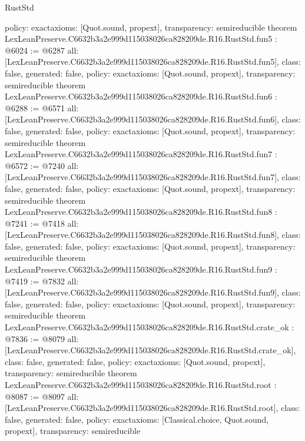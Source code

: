 \begin{lexlean}{RustStd}
\begin{coremodule}
{  policy: exact{axioms: [Quot.sound, propext]},
  transparency: semireducible
}
theorem LexLeanPreserve.C6632b3a2e999d115038026ca828209de.R16.RustStd.fun5 : @6024 := @6287 {
  all: [LexLeanPreserve.C6632b3a2e999d115038026ca828209de.R16.RustStd.fun5],
  class: false,
  generated: false,
  policy: exact{axioms: [Quot.sound, propext]},
  transparency: semireducible
}
theorem LexLeanPreserve.C6632b3a2e999d115038026ca828209de.R16.RustStd.fun6 : @6288 := @6571 {
  all: [LexLeanPreserve.C6632b3a2e999d115038026ca828209de.R16.RustStd.fun6],
  class: false,
  generated: false,
  policy: exact{axioms: [Quot.sound, propext]},
  transparency: semireducible
}
theorem LexLeanPreserve.C6632b3a2e999d115038026ca828209de.R16.RustStd.fun7 : @6572 := @7240 {
  all: [LexLeanPreserve.C6632b3a2e999d115038026ca828209de.R16.RustStd.fun7],
  class: false,
  generated: false,
  policy: exact{axioms: [Quot.sound, propext]},
  transparency: semireducible
}
theorem LexLeanPreserve.C6632b3a2e999d115038026ca828209de.R16.RustStd.fun8 : @7241 := @7418 {
  all: [LexLeanPreserve.C6632b3a2e999d115038026ca828209de.R16.RustStd.fun8],
  class: false,
  generated: false,
  policy: exact{axioms: [Quot.sound, propext]},
  transparency: semireducible
}
theorem LexLeanPreserve.C6632b3a2e999d115038026ca828209de.R16.RustStd.fun9 : @7419 := @7832 {
  all: [LexLeanPreserve.C6632b3a2e999d115038026ca828209de.R16.RustStd.fun9],
  class: false,
  generated: false,
  policy: exact{axioms: [Quot.sound, propext]},
  transparency: semireducible
}
theorem LexLeanPreserve.C6632b3a2e999d115038026ca828209de.R16.RustStd.crate_ok : @7836 := @8079 {
  all: [LexLeanPreserve.C6632b3a2e999d115038026ca828209de.R16.RustStd.crate_ok],
  class: false,
  generated: false,
  policy: exact{axioms: [Quot.sound, propext]},
  transparency: semireducible
}
theorem LexLeanPreserve.C6632b3a2e999d115038026ca828209de.R16.RustStd.root : @8087 := @8097 {
  all: [LexLeanPreserve.C6632b3a2e999d115038026ca828209de.R16.RustStd.root],
  class: false,
  generated: false,
  policy: exact{axioms: [Classical.choice, Quot.sound, propext]},
  transparency: semireducible
}


\end{coremodule}
\end{lexlean}
